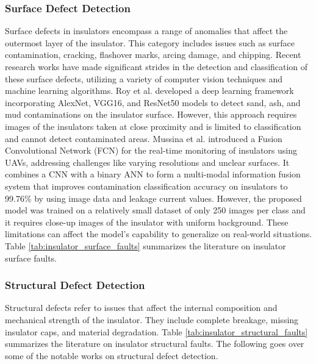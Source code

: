 \subsubsection{Surface Defect Detection}
Surface defects in insulators encompass a range of anomalies that affect the outermost layer of the insulator. This category includes issues such as surface contamination, cracking, flashover marks, arcing damage, and chipping. Recent research works have made significant strides in the detection and classification of these surface defects, utilizing a variety of computer vision techniques and machine learning algorithms. Roy et al. \cite{roy_accurate_2023} developed a deep learning framework incorporating AlexNet, VGG16, and ResNet50 models to detect sand, ash, and mud contaminations on the insulator surface. However, this approach requires images of the insulators taken at close proximity and is limited to classification and cannot detect contaminated areas. Mussina et al. \cite{mussina_multi_modal_2020} introduced a Fusion Convolutional Network (FCN) for the real-time monitoring of insulators using UAVs, addressing challenges like varying resolutions and unclear surfaces. It combines a CNN with a binary ANN to form a multi-modal information fusion system that improves contamination classification accuracy on insulators to 99.76\% by using image data and leakage current values. However, the proposed model was trained on a relatively small dataset of only 250 images per class and it requires close-up images of the insulator with uniform background. These limitations can affect the model's capability to generalize on real-world situations. Table \ref{tab:insulator_surface_faults} summarizes the literature on insulator surface faults.

\subsubsection{Structural Defect Detection}
Structural defects refer to issues that affect the internal composition and mechanical strength of the insulator. They include complete breakage, missing insulator caps, and material degradation. Table \ref{tab:insulator_structural_faults} summarizes the literature on insulator structural faults. The following goes over some of the notable works on structural defect detection.
 
